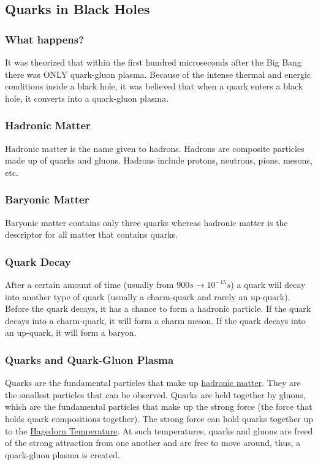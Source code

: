 \documentclass{article}
\begin{document}
\subsection{Quarks in Black Holes}
\subsubsection{What happens?}
It was theorized that within the first hundred microseconds after the Big Bang there was ONLY quark-gluon plasma. Because of the intense thermal and energic conditions inside a black hole, it was believed that when a quark enters a black hole, it converts into a quark-gluon plasma.

\subsubsection{Hadronic Matter}\label{sec:hadronicmatter}
Hadronic matter is the name given to hadrons. Hadrons are composite particles made up of quarks and gluons. Hadrons include protons, neutrons, pions, mesons, etc.

\subsubsection{Baryonic Matter}
Baryonic matter contains only three quarks whereas hadronic matter is the descriptor for all matter that contains quarks.

\subsubsection{Quark Decay}
After a certain amount of time (usually from $900s \to 10^{-15}s$) a quark will decay into another type of quark (usually a charm-quark and rarely an up-quark). Before the quark decays, it has a chance to form a hadronic particle. If the quark decays into a charm-quark, it will form a charm meson. If the quark decays into an up-quark, it will form a baryon.

\subsubsection{Quarks and Quark-Gluon Plasma}
Quarks are the fundamental particles that make up \hyperref[sec:hadronicmatter]{hadronic matter}. They are the smallest particles that can be observed. Quarks are held together by gluons, which are the fundamental particles that make up the strong force (the force that holds quark compositions together). The strong force can hold quarks together up to the \hyperref[sec:hagedorntemperature]{Hagedorn Temperature}. At such temperatures, quarks and gluons are freed of the strong attraction from one another and are free to move around, thus, a quark-gluon plasma is created.
\end{document}
